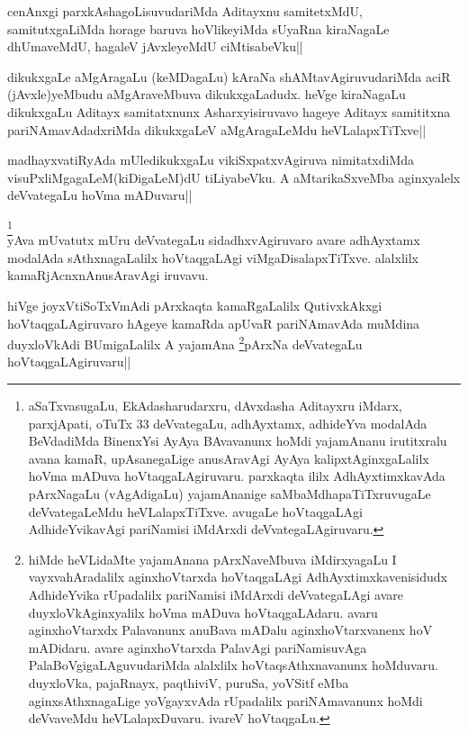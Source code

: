 \begin{artha}
cenAnxgi parxkAshagoLisuvudariMda Aditayxnu samitetxMdU, 
samitutxgaLiMda horage baruva hoVlikeyiMda sUyaRna kiraNagaLe 
dhUmaveMdU, hagaleV jAvxleyeMdU ciMtisabeVku||
\end{artha}

\begin{artha}
dikukxgaLe aMgAragaLu (keMDagaLu) kAraNa shAMtavAgiruvudariMda aciR 
(jAvxle)yeMbudu aMgAraveMbuva dikukxgaLadudx. heVge kiraNagaLu 
dikukxgaLu Aditayx samitatxnunx Asharxyisiruvavo hageye Aditayx 
samititxna pariNAmavAdadxriMda dikukxgaLeV aMgAragaLeMdu 
heVLalapxTiTxve||
\end{artha}

\begin{artha}
madhayxvatiRyAda mUledikukxgaLu vikiSxpatxvAgiruva nimitatxdiMda 
visuPxliMgagaLeM(kiDigaLeM)dU tiLiyabeVku. A aMtarikaSxveMba 
aginxyalelx deVvategaLu hoVma mADuvaru|| 
\end{artha}


\begin{artha}
\footnote[1]{aSaTxvasugaLu, EkAdasharudarxru, dAvxdasha Aditayxru 
iMdarx, parxjApati, oTuTx 33 deVvategaLu, adhAyxtamx, adhideYva 
modalAda BeVdadiMda BinenxYsi AyAya BAvavanunx hoMdi yajamAnanu 
irutitxralu avana kamaR, upAsanegaLige anusAravAgi AyAya 
kalipxtAginxgaLalilx hoVma mADuva hoVtaqgaLAgiruvaru. parxkaqta ililx 
AdhAyxtimxkavAda pArxNagaLu (vAgAdigaLu) yajamAnanige 
saMbaMdhapaTiTxruvugaLe deVvategaLeMdu heVLalapxTiTxve. avugaLe 
hoVtaqgaLAgi AdhideYvikavAgi pariNamisi iMdArxdi deVvategaLAgiruvaru.}\\
yAva mUvatutx mUru deVvategaLu sidadhxvAgiruvaro avare adhAyxtamx 
modalAda sAthxnagaLalilx hoVtaqgaLAgi viMgaDisalapxTiTxve. alalxlilx 
kamaRjAcnxnAnusAravAgi iruvavu.
\end{artha}

\begin{artha}
hiVge joyxVtiSoTxVmAdi pArxkaqta kamaRgaLalilx QutivxkAkxgi 
hoVtaqgaLAgiruvaro hAgeye kamaRda apUvaR pariNAmavAda muMdina 
duyxloVkAdi BUmigaLalilx A yajamAna \footnote[1]{hiMde heVLidaMte 
yajamAnana pArxNaveMbuva iMdirxyagaLu I vayxvahAradalilx 
aginxhoVtarxda hoVtaqgaLAgi AdhAyxtimxkavenisidudx AdhideYvika 
rUpadalilx pariNamisi iMdArxdi deVvategaLAgi avare duyxloVkAginxyalilx 
hoVma mADuva hoVtaqgaLAdaru. avaru aginxhoVtarxdx Palavanunx anuBava 
mADalu aginxhoVtarxvanenx hoV mADidaru. avare aginxhoVtarxda PalavAgi 
pariNamisuvAga PalaBoVgigaLAguvudariMda alalxlilx hoVtaqsAthxnavanunx 
hoMduvaru. duyxloVka, pajaRnayx, paqthiviV, puruSa, yoVSitf eMba 
aginxsAthxnagaLige yoVgayxvAda rUpadalilx pariNAmavanunx hoMdi 
deVvaveMdu heVLalapxDuvaru. ivareV hoVtaqgaLu.}pArxNa deVvategaLu 
hoVtaqgaLAgiruvaru||
\end{artha}

